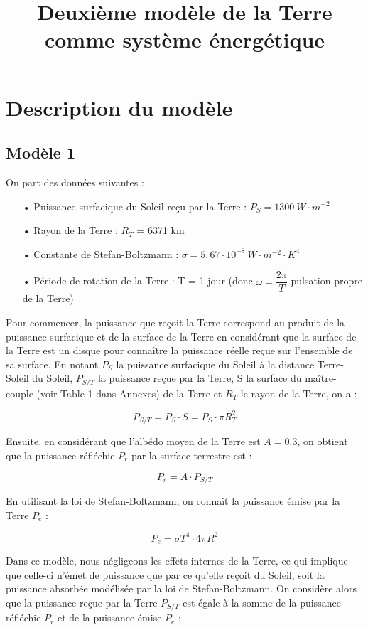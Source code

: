 \documentclass[a4paper,11pt]{article}
\title{Deuxième modèle de la Terre comme système énergétique}
\begin{document}
\maketitle

\section{Description du modèle}

\subsection{Modèle 1}

On part des données suivantes :

\begin{enumerate}

\item[•] Puissance surfacique du Soleil reçu par la Terre : $P_S = 1300 ~ W \cdot m^{-2}$
\item[•] Rayon de la Terre : $R_T$ = 6371 km
\item[•] Constante de Stefan-Boltzmann : $\sigma = 5,67 \cdot 10^{-8} ~ W \cdot m^{-2} \cdot K^4$ 
\item[•] Période de rotation de la Terre : T = 1 jour (donc $\omega = \dfrac{2\pi}{T}$ pulsation propre de la Terre)

\end{enumerate}

Pour commencer, la puissance que reçoit la Terre correspond au produit de la puissance surfacique et de la surface de la Terre en considérant que la surface de la Terre est un disque pour connaître la puissance réelle reçue sur l'ensemble de sa surface. En notant $P_S$ la puissance surfacique du Soleil à la distance Terre-Soleil du Soleil, $P_{S/T}$ la puissance reçue par la Terre, S la surface du maître-couple (voir Table 1 dans Annexes) de la Terre et $R_T$ le rayon de la Terre, on a :

\[ P_{S/T} = P_S \cdot S = P_S \cdot \pi R_T^2  \]

Ensuite, en considérant que l'albédo moyen de la Terre est $A = 0.3$, on obtient que la puissance réfléchie $P_r$ par la surface terrestre est :

\[ P_r = A \cdot P_{S/T} \]

En utilisant la loi de Stefan-Boltzmann, on connaît la puissance émise par la Terre $P_e$ :

\[ P_e = \sigma T^4 \cdot 4 \pi R^2 \]

Dans ce modèle, nous négligeons les effets internes de la Terre, ce qui implique que celle-ci n'émet de puissance que par ce qu'elle reçoit du Soleil, soit la puissance absorbée modélisée par la loi de Stefan-Boltzmann. On considère alors que la puissance reçue par la Terre $P_{S/T}$ est égale à la somme de la puissance réfléchie $P_r$ et de la puissance émise $P_e$ :
\end{document}
